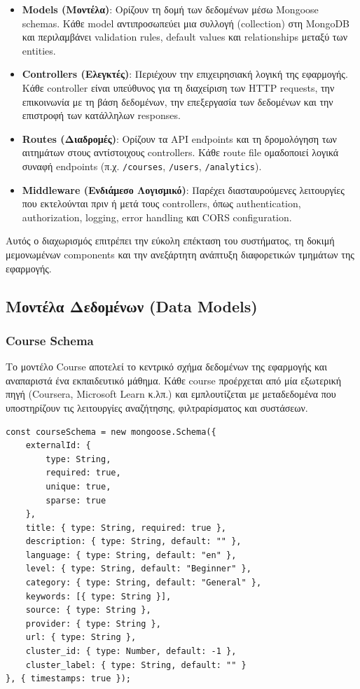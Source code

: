 \documentclass[a4paper,12pt]{article}
\begin{document}
\begin{itemize}
    \item \textbf{Models (Μοντέλα)}: Ορίζουν τη δομή των δεδομένων μέσω Mongoose schemas. Κάθε model αντιπροσωπεύει μια συλλογή (collection) στη MongoDB και περιλαμβάνει validation rules, default values και relationships μεταξύ των entities.
    
    \item \textbf{Controllers (Ελεγκτές)}: Περιέχουν την επιχειρησιακή λογική της εφαρμογής. Κάθε controller είναι υπεύθυνος για τη διαχείριση των HTTP requests, την επικοινωνία με τη βάση δεδομένων, την επεξεργασία των δεδομένων και την επιστροφή των κατάλληλων responses.
    
    \item \textbf{Routes (Διαδρομές)}: Ορίζουν τα API endpoints και τη δρομολόγηση των αιτημάτων στους αντίστοιχους controllers. Κάθε route file ομαδοποιεί λογικά συναφή endpoints (π.χ. \texttt{/courses}, \texttt{/users}, \texttt{/analytics}).
    
    \item \textbf{Middleware (Ενδιάμεσο Λογισμικό)}: Παρέχει διασταυρούμενες λειτουργίες που εκτελούνται πριν ή μετά τους controllers, όπως authentication, authorization, logging, error handling και CORS configuration.
\end{itemize}

Αυτός ο διαχωρισμός επιτρέπει την εύκολη επέκταση του συστήματος, τη δοκιμή μεμονωμένων components και την ανεξάρτητη ανάπτυξη διαφορετικών τμημάτων της εφαρμογής.

\subsection{Μοντέλα Δεδομένων (Data Models)}

\subsubsection{Course Schema}

Το μοντέλο Course αποτελεί το κεντρικό σχήμα δεδομένων της εφαρμογής και αναπαριστά ένα εκπαιδευτικό μάθημα. Κάθε course προέρχεται από μία εξωτερική πηγή (Coursera, Microsoft Learn κ.λπ.) και εμπλουτίζεται με μεταδεδομένα που υποστηρίζουν τις λειτουργίες αναζήτησης, φιλτραρίσματος και συστάσεων.

\begin{verbatim}
const courseSchema = new mongoose.Schema({
    externalId: { 
        type: String, 
        required: true, 
        unique: true, 
        sparse: true 
    },
    title: { type: String, required: true },
    description: { type: String, default: "" },
    language: { type: String, default: "en" },
    level: { type: String, default: "Beginner" },
    category: { type: String, default: "General" },
    keywords: [{ type: String }],
    source: { type: String },
    provider: { type: String },
    url: { type: String },
    cluster_id: { type: Number, default: -1 },
    cluster_label: { type: String, default: "" }
}, { timestamps: true });
\end{verbatim}
\end{document}
